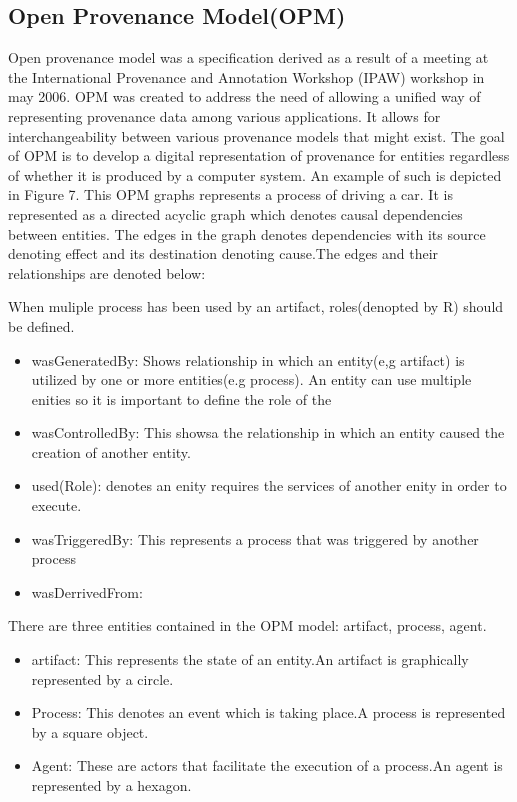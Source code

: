 \subsection{Open Provenance Model(OPM)}

Open provenance model was a specification derived as a result of a meeting at the International Provenance and Annotation Workshop (IPAW) workshop in may 2006. OPM was created to address the need of allowing a unified way of representing provenance data among various applications. It allows for interchangeability between various provenance models that might exist. The goal of OPM is to develop a digital representation of provenance for entities regardless of whether it is produced by a computer system. An example of such is depicted in Figure 7. This OPM graphs represents a process of driving a car. It is represented as a directed acyclic graph which denotes causal dependencies between entities. The edges in the graph denotes dependencies with its source denoting effect and its destination denoting cause.The edges and their relationships are denoted below: 

When muliple process has been used by an artifact, roles(denopted by R) should be defined.

\begin{itemize}
\item wasGeneratedBy: Shows relationship in which an entity(e,g artifact) is utilized by one or  more entities(e.g process). An entity can use multiple enities so it is important to define the role of the  
\item wasControlledBy: This showsa the relationship in which an entity caused the creation of another entity.
\item used(Role): denotes an enity requires the services of another enity in order to execute.
\item wasTriggeredBy: This represents a process that was triggered by another process
\item wasDerrivedFrom:
\end{itemize}

 There are three entities contained in the OPM model: artifact, process, agent. 

\begin{itemize}
\item
artifact: This represents the state of an entity.An artifact is graphically represented by a circle.

\item
Process: This denotes an event which is taking place.A process is represented by a square object.

\item 
Agent: These are actors that facilitate the execution of a process.An agent is represented by a hexagon.
\end{itemize}

